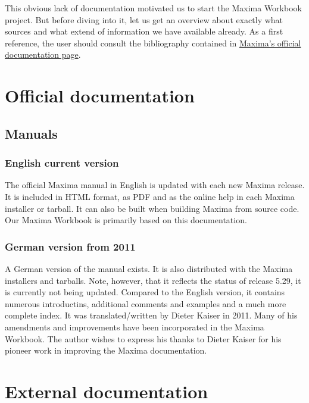 \documentclass[../Maxima_Workbook.tex]{subfiles}
\begin{document}
\lz This obvious lack of documentation motivated us to start the Maxima Workbook project. But before diving into it, let us  get an overview about exactly what sources and what extend of information we have available already. As a first reference, the user should consult the bibliography contained in \href{http://maxima.sourceforge.net/documentation.html}{Maxima's official documentation page}.

\section{Official documentation}

\subsection{Manuals}

\subsubsection{English current version}

The official Maxima manual in English is updated with each new Maxima release. It is included in HTML format, as PDF and as the online help in each Maxima installer or tarball. It can also be built when building Maxima from source code. Our Maxima Workbook is primarily based on this documentation.

\subsubsection{German version from 2011}

A German version of the manual exists. It is also distributed with the Maxima installers and tarballs. Note, however, that it reflects the status of release 5.29, it is currently not being updated. Compared to the English version, it contains numerous introductins, additional comments and examples and a much more complete index. It was translated/written by Dieter Kaiser in 2011. Many of his amendments and improvements have been incorporated in the Maxima Workbook. The author wishes to express his thanks to Dieter Kaiser for his pioneer work in improving the Maxima documentation.

\section{External documentation}
\end{document}
